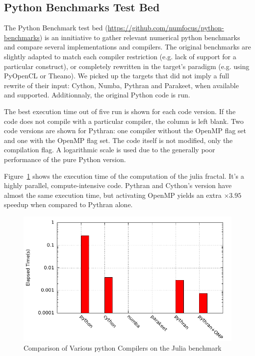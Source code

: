 \documentclass[conference]{IEEEtran}
\begin{document}
\subsection{Python Benchmarks Test Bed}

The Python Benchmark test bed
(\url{https://github.com/numfocus/python-benchmarks}) is an innitiative to
gather relevant numerical python benchmarks and compare several implementations
and compilers. The original benchmarks are slightly adapted to match each
compiler restriction (e.g. lack of support for a particular construct), or
completely rewritten in the target's paradigm (e.g. using PyOpenCL or Theano).
We picked up the targets that did not imply a full rewrite of their input:
Cython, Numba, Pythran and Parakeet, when available and supported.
Additionnaly, the original Python code is run.

The best execution time out of five run is shown for each code version. If the
code does not compile with a particular compiler, the column is left blank. Two
code versions are shown for Pythran: one compiler without the OpenMP flag set
and one with the OpenMP flag set. The code itself is not modified, only the
compilation flag. A logarithmic scale is used due to the generally poor
performance of the pure Python version.

Figure~\ref{fig:pb-julia} shows the execution time of the computation of the
julia fractal. It's a highly parallel, compute-intensive code. Pythran and
Cython's version have almost the same execution time, but activating OpenMP
yields an extra $\times 3.95$ speedup when compared to Pythran alone.

\begin{figure}[ht]
    \includegraphics[width=.5\textwidth]{julia}
    \caption{Comparison of Various python Compilers on the Julia benchmark}
    \label{fig:pb-julia}
\end{figure}
\end{document}
